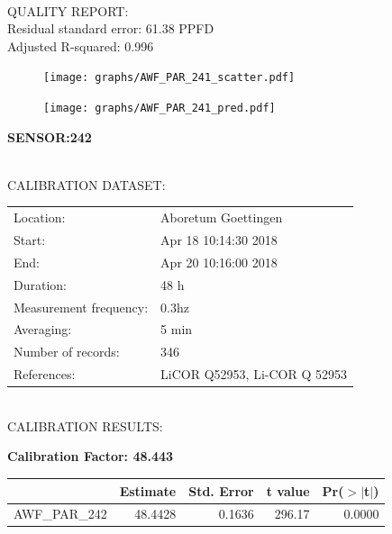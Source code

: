 \documentclass[oneside]{report}
\begin{document}
\hrulefill\\
QUALITY REPORT:\\
Residual standard error: 61.38 PPFD\\
Adjusted R-squared: 0.996



\begin{figure}[H]
  \centering
  \texttt{[image: graphs/AWF\_PAR\_241\_scatter.pdf]}
\end{figure}




\begin{figure}[H]
  \centering
  \texttt{[image: graphs/AWF\_PAR\_241\_pred.pdf]}
\end{figure}

\pagebreak


\begin{center}
\large{\textbf{SENSOR:242}}\\
\end{center}

\hrulefill\\
CALIBRATION DATASET:\\
\begin{table}[h!]
  \centering
  \label{tab:table1}
  \begin{tabular}{ll}
    Location: & Aboretum Goettingen\\ 
    
    
    Start:  & Apr 18 10:14:30 2018 \\
    End:   & Apr 20 10:16:00 2018\\ 
    Duration: & 48 h\\
    Measurement frequency: & 0.3hz\\
    Averaging:  &5 min\\
    Number of records: & 346 \\
    References: & LiCOR Q52953, Li-COR Q 52953 \\
  \end{tabular}
\end{table}

\hrulefill\\
CALIBRATION RESULTS:\\


\begin{center}
\textbf{\large{Calibration Factor: 48.443}}\\
\end{center}
\begin{table}[ht]
\centering
\begin{tabular}{rrrrr}
  \hline
 & Estimate & Std. Error & t value & Pr($>$$|$t$|$) \\ 
  \hline
AWF\_PAR\_242 & 48.4428 & 0.1636 & 296.17 & 0.0000 \\ 
   \hline
\end{tabular}
\end{table}
\end{document}

